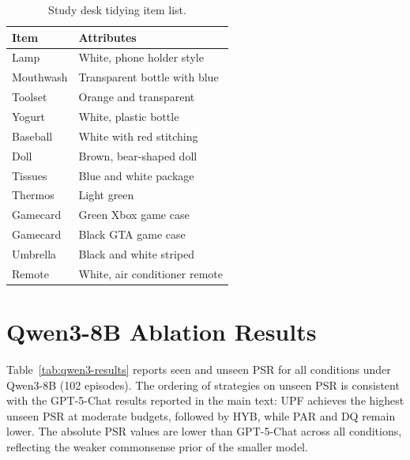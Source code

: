 \documentclass[manuscript,review,anonymous]{acmart}
\begin{document}
\begin{table}[h]
\centering
\begin{tabular}{ll}
\toprule
\textbf{Item} & \textbf{Attributes} \\
\midrule
Lamp & White, phone holder style \\
Mouthwash & Transparent bottle with blue \\
Toolset & Orange and transparent \\
Yogurt & White, plastic bottle \\
Baseball & White with red stitching \\
Doll & Brown, bear-shaped doll \\
Tissues & Blue and white package \\
Thermos & Light green \\
Gamecard & Green Xbox game case \\
Gamecard & Black GTA game case \\
Umbrella & Black and white striped \\
Remote & White, air conditioner remote \\
\bottomrule
\end{tabular}
\caption{Study desk tidying item list.}
\end{table}

\section{Qwen3-8B Ablation Results}
\label{app:qwen3}
Table~\ref{tab:qwen3-results} reports seen and unseen PSR for all conditions under Qwen3-8B (102 episodes). The ordering of strategies on unseen PSR is consistent with the GPT-5-Chat results reported in the main text: UPF achieves the highest unseen PSR at moderate budgets, followed by HYB, while PAR and DQ remain lower. The absolute PSR values are lower than GPT-5-Chat across all conditions, reflecting the weaker commonsense prior of the smaller model.
\end{document}
